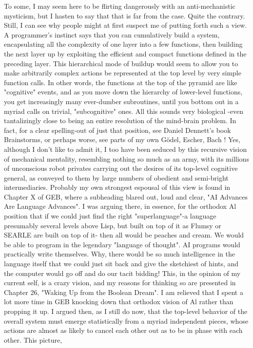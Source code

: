         To some, I may seem here to be flirting dangerously with an anti-mechanistic
mysticism, but I hasten to say that that is far from the case. Quite the contrary. Still, I
can see why people might at first suspect me of putting forth such a view. A
programmer's instinct says that you can cumulatively build a system, encapsulating all
the complexity of one layer into a few functions, then building the next layer up by
exploiting the efficient and compact functions defined in the preceding layer. This
hierarchical mode of buildup would seem to allow you to make arbitrarily complex
actions be represented at the top level by very simple function calls. In other words,
the functions at the top of the pyramid are like "cognitive" events, and as you move
down the hierarchy of lower-level functions, you get increasingly many ever-dumber
subroutines, until you bottom out in a myriad calls on trivial, "subcognitive" ones. All
this sounds very biological -even tantalizingly close to being an entire resolution of
the mind-brain problem. In fact, for a clear spelling-out of just that position, see
Daniel Dennett's book Brainstorms, or perhaps worse, see parts of my own Gödel,
Escher, Bach !
        Yes, although I don't like to admit it, I too have been seduced by this recursive
vision of mechanical mentality, resembling nothing so much as an army, with its
millions of unconscious robot privates carrying out the desires of its top-level
cognitive general, as conveyed to them by large numbers of obedient and semi-bright
intermediaries. Probably my own strongest espousal of this view is found in Chapter
X of GEB, where a subheading blared out, loud and clear, "AI Advances Are
Language Advances". I was arguing there, in essence, for the orthodox Al position
that if we could just find the right "superlanguage"-a language presumably several
levels above Lisp, but built on top of it as Flumsy or SEARLE are built on top of it-
then all would be peaches and cream. We would be able to program in the legendary
"language of thought". AI programs would practically write themselves. Why, there
would be so much intelligence in the language itself that we could just sit back and
give the sketchiest of hints, and the computer would go off and do our tacit bidding!
        This, in the opinion of my current self, is a crazy vision, and my reasons for
thinking so are presented in Chapter 26, "Waking Up from the Boolean Dream". I am
relieved that I spent a lot more time in GEB knocking down that orthodox vision of Al
rather than propping it up. I argued then, as I still do now, that the top-level behavior
of the overall system must emerge statistically from a myriad independent pieces,
whose actions are almost as likely to cancel each other out as to be in phase with each
other. This picture,





